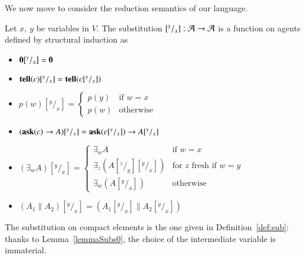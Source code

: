 \documentclass[main.tex]{subfiles}
\begin{document}
We now move to consider the reduction semantics of our language.

\begin{definition}[Substitutions]
Let $x$, $y$ be variables in $V$. 
The substitution $[^y/_x]: \mathcal{A} \rightarrow \mathcal{A}$ is a function 
on agents defined by structural induction as 

\begin{itemize}
\item ${\mathbf 0} [^y/_x] = {\mathbf 0}$
\item ${\bf tell}(c) [^y/_x] = {\bf tell}(c [^y/_x])$
\item $p(w) [^y/_x] = \begin{cases} p(y) & \text{if $w = x$}\\
                                                        p(w) & \text{otherwise}
                                 \end{cases}$
\item $({\bf ask}(c) \rightarrow A) [^y/_x] = {\bf ask}(c[^y/_x]) \rightarrow A [^y/_x]$
\item $(\exists_w A) [^y/_x]  = \begin{cases} \exists_w A & \text{if $w = x$}\\
                                                                      \exists_z (A[^z/_y][^y/_x]) & \text{for $z$ fresh if $w = y$}\\
                                                                      \exists_w (A[^y/_x]) & \text{otherwise}
                                 \end{cases}$
\item $(A_1 \parallel A_2) [^y/_x]  = (A_1 [^y/_x] \parallel A_2 [^y/_x] )$
\end{itemize}
\end{definition}

The substitution on compact elements is the one given in Definition~\ref{def:sub}: thanks to Lemma~\ref{lemmaSubs0}, 
the choice of the intermediate variable is immaterial.
\end{document}
